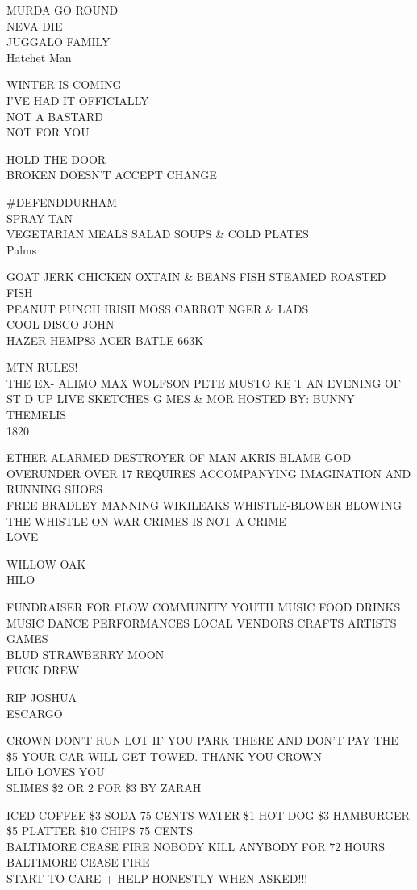 \documentclass[10pt,letterpaper]{article}
\begin{document}
MURDA GO ROUND\\
NEVA DIE\\
JUGGALO FAMILY\\
Hatchet Man

WINTER IS COMING\\
I'VE HAD IT OFFICIALLY\\
NOT A BASTARD\\
NOT FOR YOU

HOLD THE DOOR\\
BROKEN DOESN'T ACCEPT CHANGE

\#DEFENDDURHAM\\
SPRAY TAN\\
VEGETARIAN MEALS SALAD SOUPS \& COLD PLATES\\
Palms

GOAT JERK CHICKEN OXTAIN \& BEANS FISH STEAMED ROASTED FISH\\
PEANUT PUNCH IRISH MOSS CARROT NGER \& LADS\\
COOL DISCO JOHN\\
HAZER HEMP83 ACER BATLE 663K

MTN RULES!\\
THE EX{-} ALIMO MAX WOLFSON PETE MUSTO KE T AN EVENING OF ST D UP LIVE SKETCHES G MES \& MOR HOSTED BY: BUNNY THEMELIS\\
1820

ETHER ALARMED DESTROYER OF MAN AKRIS BLAME GOD\\
OVERUNDER OVER 17 REQUIRES ACCOMPANYING IMAGINATION AND RUNNING SHOES\\
FREE BRADLEY MANNING WIKILEAKS WHISTLE{-}BLOWER BLOWING THE WHISTLE ON WAR CRIMES IS NOT A CRIME\\
LOVE

WILLOW OAK\\
HILO

FUNDRAISER FOR FLOW COMMUNITY YOUTH MUSIC FOOD DRINKS MUSIC DANCE PERFORMANCES LOCAL VENDORS CRAFTS ARTISTS GAMES\\
BLUD STRAWBERRY MOON\\
FUCK DREW

RIP JOSHUA\\
ESCARGO

CROWN DON'T RUN LOT IF YOU PARK THERE AND DON'T PAY THE \$5 YOUR CAR WILL GET TOWED.  THANK YOU CROWN\\
LILO LOVES YOU\\
SLIMES \$2 OR 2 FOR \$3 BY ZARAH

ICED COFFEE \$3 SODA 75 CENTS WATER \$1 HOT DOG \$3 HAMBURGER \$5 PLATTER \$10 CHIPS 75 CENTS\\
BALTIMORE CEASE FIRE NOBODY KILL ANYBODY FOR 72 HOURS\\
BALTIMORE CEASE FIRE\\
START TO CARE + HELP HONESTLY WHEN ASKED!!!
\end{document}
